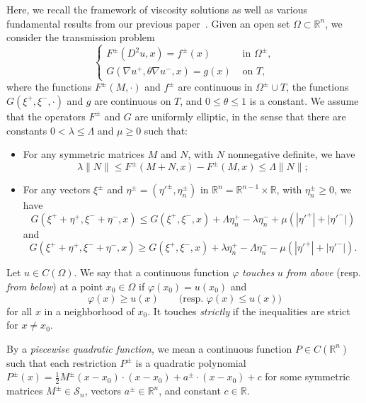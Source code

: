 \documentclass[letter,11pt]{amsart}
\newcommand{\R}{\mathbb{R}}
\newcommand{\scal}{\mathcal{S}}
\theoremstyle{definition}
\numberwithin{equation}{section}
\begin{document}
Here, we recall the framework of viscosity solutions as well as various fundamental results from our previous paper~\cite{E}.
Given an open set $\Omega \subset \R^n$, we consider the transmission problem
\begin{equation}
\label{eq:nl}
\begin{cases}
F^{\pm} (D^2 u, x) = f^{\pm}(x) & \text{ in } 
\Omega^{\pm},\\
G(\nabla u^{+}, \theta \nabla u^{-}, x) = g(x)
 & \text{ on } T,
\end{cases}
\end{equation}
where the functions $F^{\pm}(M, \cdot)$ and $f^{\pm}$ are continuous in $\Omega^{\pm} \cup T$,
the functions $G(\xi^{+}, \xi^{-}, \cdot)$ and $g$ are continuous on $T$, and $0 \leq \theta \leq 1$ is a constant.
We assume that the operators $F^{\pm}$ and $G$ are uniformly elliptic, in the sense that there are constants $0 < \lambda \leq \Lambda$ and $\mu \geq 0$ such that:
\begin{itemize}
\item For any symmetric matrices $M$ and $N$, with $N$ nonnegative definite, we have
\[ 
\lambda \|N\| \leq F^{\pm}(M + N,x) - F^{\pm}(M,x) \leq \Lambda \|N\|;
\]
\item
For any vectors $\xi^{\pm}$ and $\eta^{\pm} = (\eta'^{\pm}, \eta_n^{\pm})$ in $\R^{n} = \R^{n-1} \times \R$, with $\eta_n^{\pm} \geq 0$, we have
\[
G(\xi^{+} + \eta^{+}, \xi^{-} + \eta^{-}, x) \leq G(\xi^{+}, \xi^{-}, x) + \Lambda \eta^{+}_n - \lambda \eta^{-}_n  + \mu( |\eta'^{+}| + |\eta'^{-}|)
\]
and
\[
G(\xi^{+} + \eta^{+}, \xi^{-} + \eta^{-}, x) \geq 
G(\xi^{+}, \xi^{-}, x) + \lambda \eta^{+}_n - \Lambda \eta^{-}_n 
- \mu (|\eta'^{+}| + |\eta'^{-}|).
\]
\end{itemize}

\medskip

Let $u \in C(\Omega)$.
We say that 
a continuous function $\varphi$ \emph{touches} $u$ \emph{ from above} (resp. \emph{from below}) at a point $x_0 \in \Omega$ if $\varphi(x_0) = u(x_0)$ and 
\[
\varphi(x) \geq u(x) \qquad \text{(resp. } \varphi(x) \leq u(x))
\]
for all $x$ in a neighborhood of $x_0$.
It touches \emph{strictly} if the inequalities are strict for $x \neq x_0$.

\medskip

By a \emph{piecewise quadratic function}, we mean a continuous function $P \in C(\R^{n})$ such that each restriction $P^{\pm}$ is a quadratic polynomial 
$P^{\pm}(x) = \frac{1}{2} M^{\pm} (x-x_0) \cdot (x-x_0) + a^{\pm} \cdot (x-x_0) + c$
for some symmetric matrices $M^{\pm} \in \scal_n$, vectors $a^{\pm} \in \R^{n}$, and constant $c \in \R$.
\end{document}
